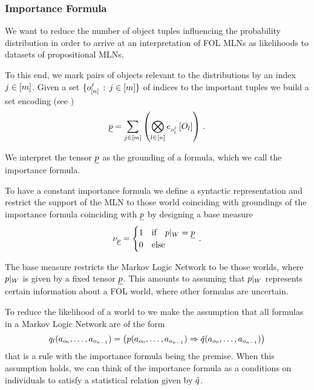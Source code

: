 	
	
\subsubsection{Importance Formula}


We want to reduce the number of object tuples influencing the probability distribution in order to arrive at an interpretation of FOL MLNs as likelihoods to datasets of propositional MLNs.

To this end, we mark pairs of objects relevant to the distributions by an index $j\in[m]$.
Given a set $\{o_{[n]}^{j} \, : \, j\in[m] \}$ of indices to the important tuples we build a set encoding (see )
\begin{align*}
	\underline{p} = \sum_{j\in[m]} \left(
		 \bigotimes_{l\in[n]} e_{o_{l}^{j}}\left[O_{l}\right]
	 \right) \, . 
\end{align*}

We interpret the tensor $\underline{p}$ as the grounding of a formula, which we call the importance formula.

To have a constant importance formula we define a syntactic representation and restrict the support of the MLN to those world coinciding with groundings of the importance formula coinciding with $\underline{p}$ by designing a base measure
\begin{align*}
	\nu_{\underline{p}}= \begin{cases}
		1 & \text{if} \quad {p}|_{W} = \underline{p} \\
		0 & \text{else}
	\end{cases} \, . 
\end{align*}

The base measure restricts the Markov Logic Network to be those worlds, where ${p}|_{W}$ is given by a fixed tensor $\underline{p}$.
This amounts to assuming that ${p}|_{W}$ represents certain information about a FOL world, where other formulas are uncertain.



To reduce the likelihood of a world to we make the assumption that all formulas in a Markov Logic Network are of the form
\begin{align}\label{eq:folImplicationForm}
	q_{l}(a_{o_{0}},\ldots,a_{o_{n-1}}) =
	\left( p(a_{o_{0}},\ldots,a_{o_{n-1}}) \Rightarrow \tilde{q}(a_{o_{0}},\ldots,a_{o_{n-1}}) \right) 
\end{align}
that is a rule with the importance formula being the premise.
When this assumption holds, we can think of the importance formula as a conditions on individuals to satisfy a statistical relation given by $\tilde{q}$.

